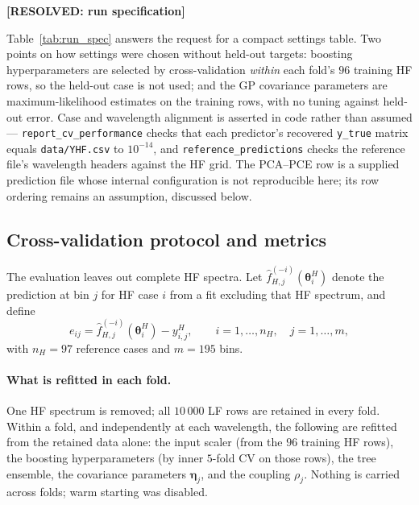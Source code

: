 \documentclass[12pt, letterpaper, oneside]{article}
\newcommand{\resolved}[2]{\par\begingroup\small\color{green!35!black}%
\noindent\textbf{[RESOLVED: #1]}\par\nobreak\noindent #2\par\endgroup}
\begin{document}
\resolved{run specification}{Table~\ref{tab:run_spec} answers the request for
a compact settings table. Two points on how settings were chosen without
held-out targets: boosting hyperparameters are selected by cross-validation
\emph{within} each fold's $96$ training HF rows, so the held-out case is not
used; and the GP covariance parameters are maximum-likelihood estimates on the
training rows, with no tuning against held-out error. Case and wavelength
alignment is asserted in code rather than assumed ---
\texttt{report\_cv\_performance} checks that each predictor's recovered
\texttt{y\_true} matrix equals \texttt{data/YHF.csv} to $10^{-14}$, and
\texttt{reference\_predictions} checks the reference file's wavelength headers
against the HF grid. The PCA--PCE row is a supplied prediction file whose
internal configuration is not reproducible here; its row ordering remains an
assumption, discussed below.}

\subsection{Cross-validation protocol and metrics}
\label{sec:cv_protocol}

The evaluation leaves out complete HF spectra. Let
$\widehat f^{(-i)}_{H,j}(\bm\theta_i^H)$ denote the prediction at bin $j$
for HF case $i$ from a fit excluding that HF spectrum, and define
\[
e_{ij}=\widehat f^{(-i)}_{H,j}(\bm\theta_i^H)-y^H_{i,j},
\qquad i=1,\ldots,n_H,\quad j=1,\ldots,m,
\]
with $n_H=97$ reference cases and $m=195$ bins.

\paragraph{What is refitted in each fold.} One HF spectrum is removed; all
$10\,000$ LF rows are retained in every fold. Within a fold, and independently
at each wavelength, the following are refitted from the retained data alone:
the input scaler (from the $96$ training HF rows), the boosting
hyperparameters (by inner $5$-fold CV on those rows), the tree ensemble, the
covariance parameters $\bm\eta_j$, and the coupling $\rho_j$. Nothing is
carried across folds; warm starting was disabled.
\end{document}
